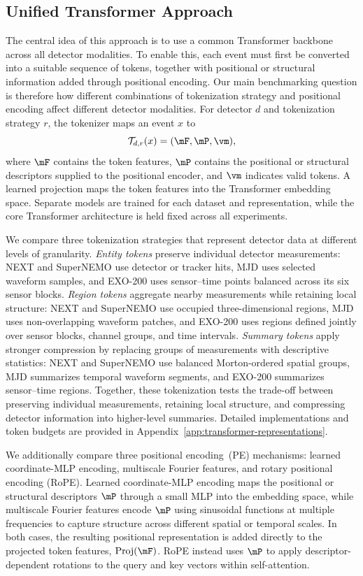 \subsection{Unified Transformer Approach}
\label{sec:transformer-models}
The central idea of this approach is to use a common Transformer backbone across all detector modalities. To enable this, each event must first be converted into a suitable sequence of tokens, together with positional or structural information added through positional encoding. Our main benchmarking question is therefore how different combinations of tokenization strategy and positional encoding affect different detector modalities. For detector $d$ and tokenization strategy $r$, the tokenizer maps an event $x$ to
\[
\mathcal{T}_{d,r}(x)=(\mF,\mP,\vm),
\]
where $\mF$ contains the token features, $\mP$ contains the positional or structural descriptors supplied to the positional encoder, and $\vm$ indicates valid tokens. A learned projection maps the token features into the Transformer embedding space. Separate models are trained for each dataset and representation, while the core Transformer architecture is held fixed across all experiments.

We compare three tokenization strategies that represent detector data at different levels of granularity. \emph{Entity tokens} preserve individual detector measurements: NEXT and SuperNEMO use detector or tracker hits, MJD uses selected waveform samples, and EXO-200 uses sensor--time points balanced across its six sensor blocks. \emph{Region tokens} aggregate nearby measurements while retaining local structure: NEXT and SuperNEMO use occupied three-dimensional regions, MJD uses non-overlapping waveform patches, and EXO-200 uses regions defined jointly over sensor blocks, channel groups, and time intervals. \emph{Summary tokens} apply stronger compression by replacing groups of measurements with descriptive statistics: NEXT and SuperNEMO use balanced Morton-ordered spatial groups, MJD summarizes temporal waveform segments, and EXO-200 summarizes sensor--time regions. Together, these tokenization tests the trade-off between preserving individual measurements, retaining local structure, and compressing detector information into higher-level summaries. Detailed implementations and token budgets are provided in Appendix~\ref{app:transformer-representations}.


We additionally compare three positional encoding~(PE) mechanisms: learned coordinate-MLP encoding, multiscale Fourier features, and rotary positional encoding (RoPE). Learned coordinate-MLP encoding maps the positional or structural descriptors $\mP$ through a small MLP into the embedding space, while multiscale Fourier features encode $\mP$ using sinusoidal functions at multiple frequencies to capture structure across different spatial or temporal scales. In both cases, the resulting positional representation is added directly to the projected token features, $\operatorname{Proj}(\mF)$. RoPE instead uses $\mP$ to apply descriptor-dependent rotations to the query and key vectors within self-attention.

